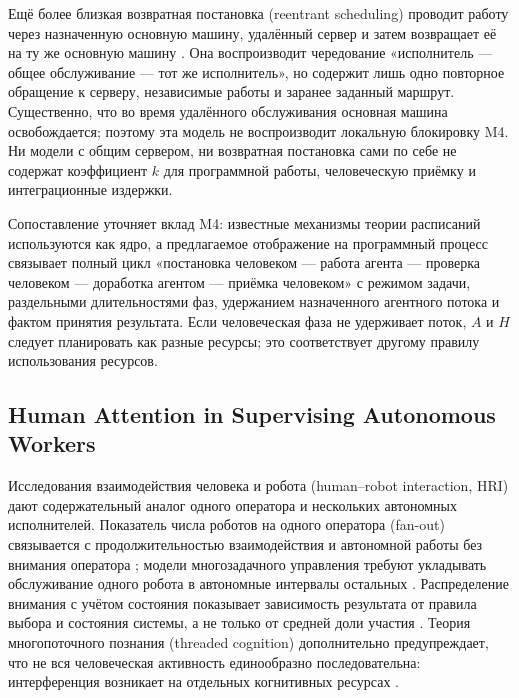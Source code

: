 Ещё более близкая возвратная постановка (reentrant scheduling) проводит работу через назначенную основную машину, удалённый сервер и затем возвращает её на ту же основную машину \cite{chakhlevitch2009reentrant}. Она воспроизводит чередование «исполнитель --- общее обслуживание --- тот же исполнитель», но содержит лишь одно повторное обращение к серверу, независимые работы и заранее заданный маршрут. Существенно, что во время удалённого обслуживания основная машина освобождается; поэтому эта модель не воспроизводит локальную блокировку M4. Ни модели с общим сервером, ни возвратная постановка сами по себе не содержат коэффициент $k$ для программной работы, человеческую приёмку и интеграционные издержки.

Сопоставление уточняет вклад M4: известные механизмы теории расписаний используются как ядро, а предлагаемое отображение на программный процесс связывает полный цикл «постановка человеком --- работа агента --- проверка человеком --- доработка агентом --- приёмка человеком» с режимом задачи, раздельными длительностями фаз, удержанием назначенного агентного потока и фактом принятия результата. Если человеческая фаза не удерживает поток, $A$ и $H$ следует планировать как разные ресурсы; это соответствует другому правилу использования ресурсов.

\subsection{Human Attention in Supervising Autonomous Workers}

Исследования взаимодействия человека и робота (human--robot interaction, HRI) дают содержательный аналог одного оператора и нескольких автономных исполнителей. Показатель числа роботов на одного оператора (fan-out) связывается с продолжительностью взаимодействия и автономной работы без внимания оператора \cite{olsen2004fanout}; модели многозадачного управления требуют укладывать обслуживание одного робота в автономные интервалы остальных \cite{crandall2005validating}. Распределение внимания с учётом состояния показывает зависимость результата от правила выбора и состояния системы, а не только от средней доли участия \cite{crandall2011computing}. Теория многопоточного познания (threaded cognition) дополнительно предупреждает, что не вся человеческая активность единообразно последовательна: интерференция возникает на отдельных когнитивных ресурсах \cite{salvucci2008threaded}.


